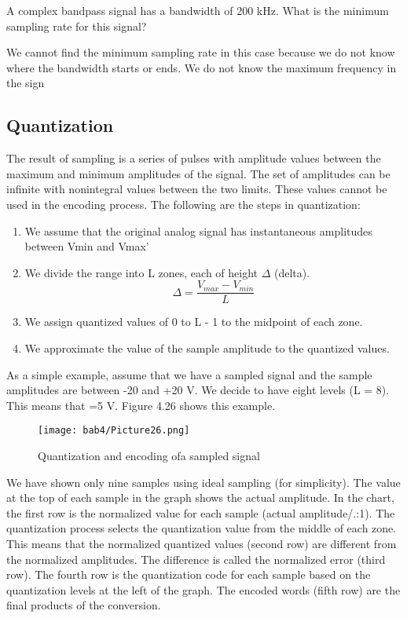 \vspace{12pt}

\begin{example}
  A complex bandpass signal has a bandwidth of 200 kHz. What is the minimum sampling rate for this signal?
\end{example}

\begin{solution}
  We cannot find the minimum sampling rate in this case because we do not know where the bandwidth starts or ends. We do not know the maximum frequency in the sign
\end{solution}

\subsection*{Quantization}
The result of sampling is a series of pulses with amplitude values between the maximum and minimum amplitudes of the signal. The set of amplitudes can be infinite with nonintegral values between the two limits. These values cannot be used in the encoding process. The following are the steps in quantization:
\begin{enumerate}
  \item We assume that the original analog signal has instantaneous amplitudes between Vmin and Vmax'
  \item We divide the range into L zones, each of height $\Delta$ (delta).
  \begin{equation*}
    \Delta = \frac{V_{max} - V_{min}}{L}
  \end{equation*}
  \item We assign quantized values of 0 to L - 1 to the midpoint of each zone.
  \item We approximate the value of the sample amplitude to the quantized values.
\end{enumerate}

As a simple example, assume that we have a sampled signal and the sample amplitudes are between -20 and +20 V. We decide to have eight levels (L = 8). This means that =5 V. Figure 4.26 shows this example.

\begin{figure}[htbp]
  \centering
  \texttt{[image: bab4/Picture26.png]}
  \caption{Quantization and encoding ofa sampled signal}
  \label{fig4:26}
\end{figure}

We have shown only nine samples using ideal sampling (for simplicity). The value at the top of each sample in the graph shows the actual amplitude. In the chart, the first row is the normalized value for each sample (actual amplitude/.:1). The quantization process selects the quantization value from the middle of each zone. This means that the normalized quantized values (second row) are different from the normalized amplitudes. The difference is called the normalized error (third row). The fourth row is the quantization code for each sample based on the quantization levels at the left of the graph. The encoded words (fifth row) are the final products of the conversion.


